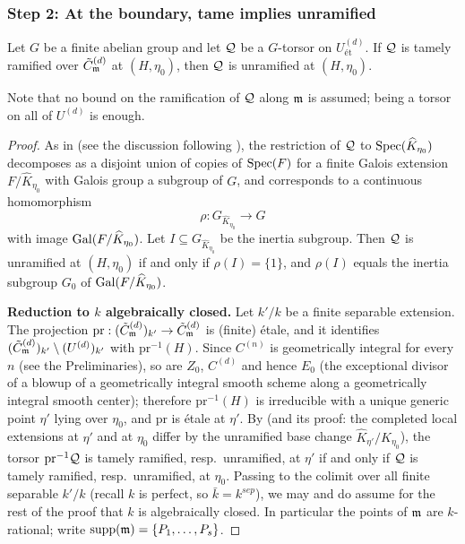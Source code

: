 \subsubsection*{Step 2: At the boundary, tame implies unramified}

\begin{prop}\label{prop:tame_at_boundary_implies_unramified}
    Let $G$ be a finite abelian group and let $\mathcal{Q}$ be a $G$-torsor on $U^{(d)}_{\text{\'et}}$.
    If $\mathcal{Q}$ is tamely ramified over $\tilde{C}_{\mathfrak{m}}^{(d)}$ at $(H, \eta_0)$, then $\mathcal{Q}$ is unramified at
    $(H, \eta_0)$.
\end{prop}

Note that no bound on the ramification of $\mathcal{Q}$ along $\mathfrak{m}$ is assumed;
being a torsor on all of $U^{(d)}$ is enough.

\begin{proof}
    As in  (see the discussion following
    ), the restriction of $\mathcal{Q}$ to
    $\operatorname{Spec}(\widehat{K}_{\eta_0})$ decomposes as a disjoint union of copies of $\operatorname{Spec}(F)$ for a finite
    Galois extension $F / \widehat{K}_{\eta_0}$ with Galois group a subgroup of $G$, and corresponds to a
    continuous homomorphism
    \[ \rho : G_{\widehat{K}_{\eta_0}} \to G \]
    with image $\operatorname{Gal}(F/\widehat{K}_{\eta_0})$. Let $I \subseteq G_{\widehat{K}_{\eta_0}}$ be the inertia
    subgroup. Then $\mathcal{Q}$ is unramified at $(H,\eta_0)$ if and only if $\rho(I) = \{1\}$, and
    $\rho(I)$ equals the inertia subgroup $G_0$ of $\operatorname{Gal}(F/\widehat{K}_{\eta_0})$.

    \textbf{Reduction to $k$ algebraically closed.}
    Let $k'/k$ be a finite separable extension. The projection
    $\mathrm{pr} : (\tilde{C}_{\mathfrak{m}}^{(d)})_{k'} \to \tilde{C}_{\mathfrak{m}}^{(d)}$ is (finite) \'etale, and it identifies
    $(\tilde{C}_{\mathfrak{m}}^{(d)})_{k'} \setminus (U^{(d)})_{k'}$ with $\mathrm{pr}^{-1}(H)$. Since $C^{(n)}$ is
    geometrically integral for every $n$ (see the Preliminaries), so are $Z_0$, $C^{(d)}$ and hence
    $E_0$ (the exceptional divisor of a blowup of a geometrically integral smooth scheme along a
    geometrically integral smooth center); therefore $\mathrm{pr}^{-1}(H)$ is irreducible with a unique
    generic point $\eta'$ lying over $\eta_0$, and $\mathrm{pr}$ is \'etale at $\eta'$. By
     (and its proof: the completed local extensions at
    $\eta'$ and at $\eta_0$ differ by the unramified base change
    $\widehat{K}_{\eta'} / \widehat{K}_{\eta_0}$), the torsor $\mathrm{pr}^{-1}\mathcal{Q}$ is tamely ramified,
    resp.\ unramified, at $\eta'$ if and only if $\mathcal{Q}$ is tamely ramified, resp.\ unramified, at
    $\eta_0$. Passing to the colimit over all finite separable $k'/k$ (recall $k$ is perfect, so
    $\bar{k} = k^{sep}$), we may and do assume for the rest of the proof that $k$ is algebraically
    closed. In particular the points of $\mathfrak{m}$ are $k$-rational; write
    $\operatorname{supp}(\mathfrak{m}) = \{P_1, \dots, P_s\}$.


\end{proof}
